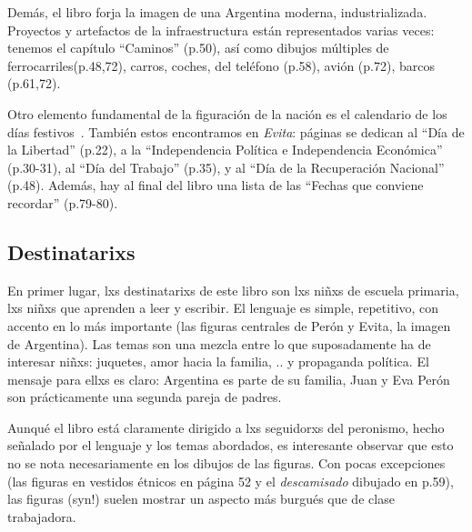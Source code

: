 Demás, el libro forja la imagen de una Argentina moderna, industrializada.
Proyectos y artefactos de la infraestructura están representados varias veces:
tenemos el capítulo ``Caminos'' (p.50), así como dibujos múltiples de ferrocarriles(p.48,72), carros, coches, del teléfono (p.58), avión (p.72), barcos (p.61,72).

Otro elemento fundamental de la figuración de la nación es el calendario de los días festivos~\autocite{SzIr2009}.
También estos encontramos en \textit{Evita}:
páginas se dedican al
``Día de la Libertad'' (p.22),
a la ``Independencia Política e Independencia Económica'' (p.30-31),
al ``Día del Trabajo'' (p.35),
y al ``Día de la Recuperación Nacional'' (p.48).
Además, hay al final del libro una lista de las ``Fechas que conviene recordar'' (p.79-80).


\subsection{Destinatarixs}

En primer lugar, lxs destinatarixs de este libro son lxs niñxs de escuela primaria, lxs niñxs que aprenden a leer y escribir.
El lenguaje es simple, repetitivo, con accento en lo más importante (las figuras centrales de Perón y Evita, la imagen de Argentina).
Las temas son una mezcla entre lo que suposadamente ha de interesar niñxs: juquetes, amor hacia la familia, .. y propaganda política.
El mensaje para ellxs es claro: Argentina es parte de su familia, Juan y Eva Perón son prácticamente una segunda pareja de padres.

Aunqué el libro está claramente dirigido a lxs seguidorxs del peronismo,
hecho señalado por el lenguaje y los temas abordados,
es interesante observar que esto no se nota necesariamente en los dibujos de las figuras.
Con pocas excepciones (las figuras en vestidos étnicos en página 52 y el \textit{descamisado} dibujado en p.59),
las figuras (syn!) suelen mostrar un aspecto más burgués que de clase trabajadora.


\begin{comment}

* "Policlínico Evita" (p.43), "Fundación Eva Perón"(p.43), "clubes infantiles Evita" (donde se practica futbol^^)(p.55)
* se rescatan los éxitos (el voto femenino, el pago de las deudas, p.72...)

* p.10: oraciones, rezar, catolicismo; pero también aquí "nunca olvido a Eva Perón, nuestra Madre Espiritual"
  * gottesgleichheit (hat anscheinend die kirche etwas verstoert^^ -- Chamosa o FF?)
  * kann alle wuensche verwirklichen
\end{comment}
